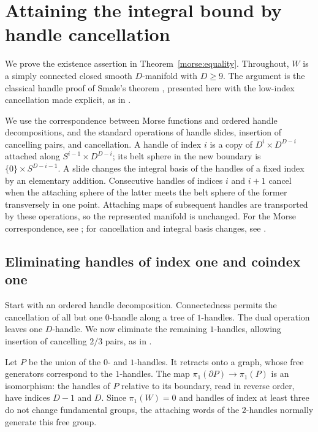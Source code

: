 \section{Attaining the integral bound by handle cancellation}
\label{handle:appendix}\label{app:handles}

We prove the existence assertion in Theorem~\ref{morse:equality}.
Throughout, $W$ is a simply connected closed smooth $D$-manifold with
$D\geq9$.  The argument is the classical handle proof of Smale's theorem
\cite{Smale1963}, presented here with the low-index cancellation made
explicit, as in \cite[Appendix~A]{OpenAICompanion}.

We use the correspondence between Morse functions and ordered handle
decompositions, and the standard operations of handle slides, insertion
of cancelling pairs, and cancellation.  A handle of index $i$ is a copy
of $D^i\times D^{D-i}$ attached along
$S^{i-1}\times D^{D-i}$; its belt sphere in the new boundary is
$\{0\}\times S^{D-i-1}$.  A slide changes the integral basis of the
handles of a fixed index by an elementary addition.  Consecutive
handles of indices $i$ and $i+1$ cancel when the attaching sphere of the
latter meets the belt sphere of the former transversely in one point.
Attaching maps of subsequent handles are transported by these
operations, so the represented manifold is unchanged.
For the Morse correspondence, see \cite{Milnor1963}; for cancellation
and integral basis changes, see
\cite[Theorems~5.4 and~7.6]{Milnor1965}.

\subsection{Eliminating handles of index one and coindex one}

Start with an ordered handle decomposition.  Connectedness permits the
cancellation of all but one $0$-handle along a tree of $1$-handles.
The dual operation leaves one $D$-handle.  We now eliminate the remaining
$1$-handles, allowing insertion of cancelling $2/3$ pairs, as in
\cite[Theorem~8.1]{Milnor1965}.

Let $P$ be the union of the $0$- and $1$-handles.  It retracts onto a
graph, whose free generators correspond to the $1$-handles.  The map
$\pi_1(\partial P)\to\pi_1(P)$ is an isomorphism: the handles of $P$
relative to its boundary, read in reverse order, have indices $D-1$
and $D$.  Since $\pi_1(W)=0$ and handles of index at least three do
not change fundamental groups, the attaching words of the $2$-handles
normally generate this free group.


